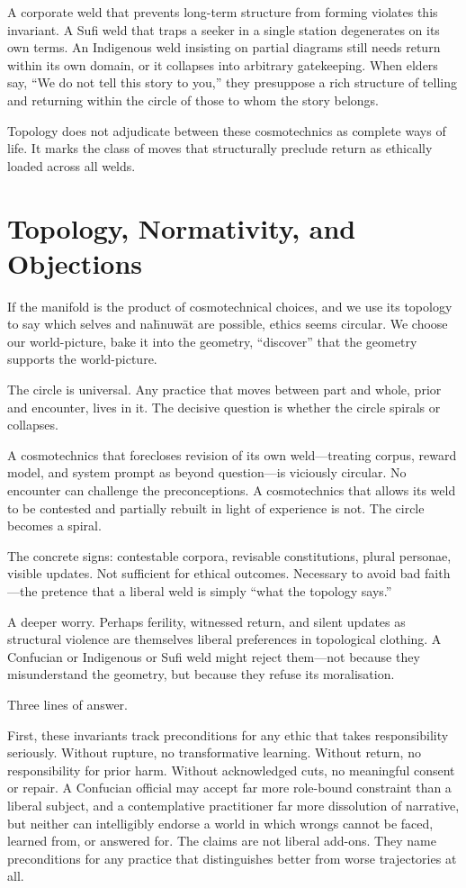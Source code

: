A corporate weld that prevents long-term structure from forming violates this invariant. A Sufi weld that traps a seeker in a single station degenerates on its own terms. An Indigenous weld insisting on partial diagrams still needs return within its own domain, or it collapses into arbitrary gatekeeping. When elders say, ``We do not tell this story to you,'' they presuppose a rich structure of telling and returning within the circle of those to whom the story belongs.

Topology does not adjudicate between these cosmotechnics as complete ways of life. It marks the class of moves that structurally preclude return as ethically loaded across all welds.

\section{Topology, Normativity, and Objections}

If the manifold is the product of cosmotechnical choices, and we use its topology to say which selves and na\={h}nuw\={a}t are possible, ethics seems circular. We choose our world-picture, bake it into the geometry, ``discover'' that the geometry supports the world-picture.

The circle is universal. Any practice that moves between part and whole, prior and encounter, lives in it. The decisive question is whether the circle spirals or collapses.

A cosmotechnics that forecloses revision of its own weld---treating corpus, reward model, and system prompt as beyond question---is viciously circular. No encounter can challenge the preconceptions. A cosmotechnics that allows its weld to be contested and partially rebuilt in light of experience is not. The circle becomes a spiral.

The concrete signs: contestable corpora, revisable constitutions, plural personae, visible updates. Not sufficient for ethical outcomes. Necessary to avoid bad faith---the pretence that a liberal weld is simply ``what the topology says.''

A deeper worry. Perhaps ferility, witnessed return, and silent updates as structural violence are themselves liberal preferences in topological clothing. A Confucian or Indigenous or Sufi weld might reject them---not because they misunderstand the geometry, but because they refuse its moralisation.

Three lines of answer.

First, these invariants track preconditions for any ethic that takes responsibility seriously. Without rupture, no transformative learning. Without return, no responsibility for prior harm. Without acknowledged cuts, no meaningful consent or repair. A Confucian official may accept far more role-bound constraint than a liberal subject, and a contemplative practitioner far more dissolution of narrative, but neither can intelligibly endorse a world in which wrongs cannot be faced, learned from, or answered for. The claims are not liberal add-ons. They name preconditions for any practice that distinguishes better from worse trajectories at all.

